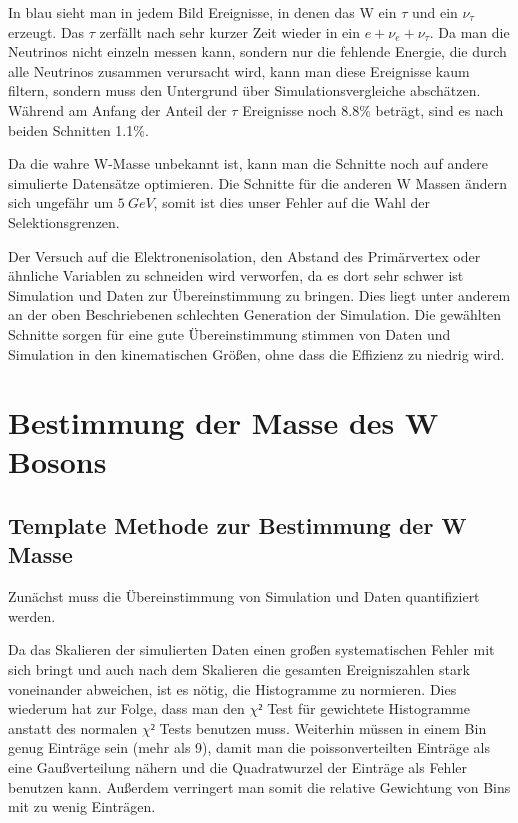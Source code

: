 \documentclass[a4paper,12pt]{article}
\begin{document}
In blau sieht man in jedem Bild Ereignisse, in denen das W ein $τ$ und ein $ν_τ$ erzeugt. Das $τ$
zerfällt nach sehr kurzer Zeit wieder in ein $e + ν_e + ν_τ$. Da man die Neutrinos nicht einzeln
messen kann, sondern nur die fehlende Energie, die durch alle Neutrinos zusammen verursacht wird,
kann man diese Ereignisse kaum filtern, sondern muss den Untergrund über Simulationsvergleiche
abschätzen. Während am Anfang der Anteil der $τ$ Ereignisse noch 8.8\% beträgt, sind es nach beiden
Schnitten 1.1\%.

Da die wahre W-Masse unbekannt ist, kann man die Schnitte noch auf andere simulierte Datensätze
optimieren. Die Schnitte für die anderen W Massen ändern sich ungefähr um $\SI{5}{GeV}$, somit ist
dies unser Fehler auf die Wahl der Selektionsgrenzen.

Der Versuch auf die Elektronenisolation, den Abstand des Primärvertex oder ähnliche Variablen zu
schneiden wird verworfen, da es dort sehr schwer ist Simulation und Daten zur Übereinstimmung zu
bringen. Dies liegt unter anderem an der oben Beschriebenen schlechten Generation der Simulation.
Die gewählten Schnitte sorgen für eine gute Übereinstimmung stimmen von Daten und Simulation in den
kinematischen Größen, ohne dass die Effizienz zu niedrig wird.

\newpage
\section{Bestimmung der Masse des W Bosons}
\subsection{Template Methode zur Bestimmung der W Masse}\label{cap:template}
Zunächst muss die Übereinstimmung von Simulation und Daten quantifiziert werden.

Da das Skalieren der simulierten Daten einen großen systematischen Fehler mit sich bringt und auch nach dem
Skalieren die gesamten Ereigniszahlen stark voneinander abweichen, ist es nötig, die Histogramme zu
normieren. Dies wiederum hat zur Folge, dass man den $χ²$ Test für gewichtete Histogramme anstatt
des normalen $χ²$ Tests benutzen
muss\cite{cramer1999mathematical}.
Weiterhin müssen in einem Bin genug
Einträge sein (mehr als 9), damit man die poissonverteilten Einträge als eine Gaußverteilung nähern 
und die Quadratwurzel der Einträge als Fehler benutzen kann. Außerdem verringert man
somit die relative Gewichtung von Bins mit zu wenig Einträgen.
\end{document}
